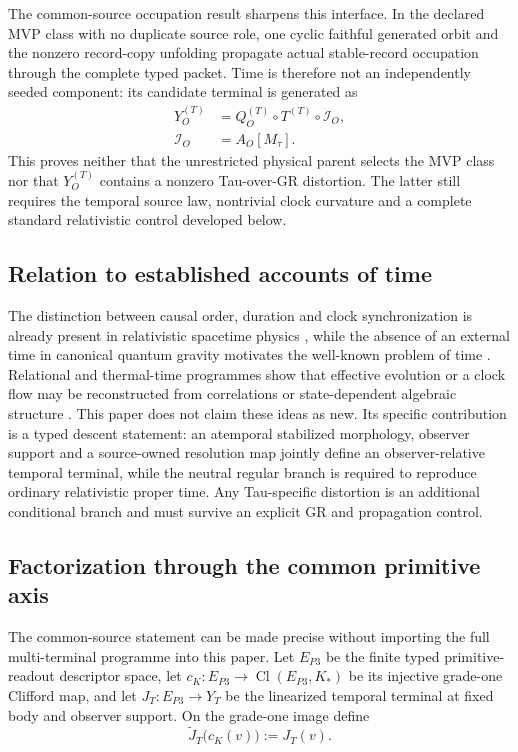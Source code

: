 \documentclass[11pt]{article}
\begin{document}
The common-source occupation result sharpens this interface. In the declared
MVP class with no duplicate source role, one cyclic faithful generated orbit
and the nonzero record-copy unfolding propagate actual stable-record
occupation through the complete typed packet. Time is therefore not an
independently seeded component: its candidate terminal is generated as
\begin{equation}
 \begin{split}
 Y_O^{(T)}&=Q_O^{(T)}\circ T^{(T)}\circ \mathcal I_O,\\
 \mathcal I_O&=A_O[M_\tau].
 \end{split}
 \label{eq:generated-time-terminal}
\end{equation}
This proves neither that the unrestricted physical parent selects the MVP
class nor that \(Y_O^{(T)}\) contains a nonzero Tau-over-GR distortion. The
latter still requires the temporal source law, nontrivial clock curvature and
a complete standard relativistic control developed below.

\subsection{Relation to established accounts of time}

The distinction between causal order, duration and clock synchronization is
already present in relativistic spacetime physics \cite{Minkowski1909}, while
the absence of an external time in canonical quantum gravity motivates the
well-known problem of time \cite{WheelerDeWitt1967,Rovelli2004}. Relational
and thermal-time programmes show that effective evolution or a clock flow may
be reconstructed from correlations or state-dependent algebraic structure
\cite{PageWootters1983,ConnesRovelli1994}. This paper does not claim these
ideas as new. Its specific contribution is a typed descent statement: an
atemporal stabilized morphology, observer support and a source-owned
resolution map jointly define an observer-relative temporal terminal, while
the neutral regular branch is required to reproduce ordinary relativistic
proper time. Any Tau-specific distortion is an additional conditional branch
and must survive an explicit GR and propagation control.

\subsection{Factorization through the common primitive axis}

The common-source statement can be made precise without importing the full
multi-terminal programme into this paper. Let \(E_{P3}\) be the finite typed
primitive-readout descriptor space, let
\(c_K:E_{P3}\rightarrow\operatorname{Cl}(E_{P3},K_*)\) be its injective
grade-one Clifford map, and let \(J_T:E_{P3}\rightarrow Y_T\) be the
linearized temporal terminal at fixed body and observer support. On the
grade-one image define
\begin{equation}
 \widetilde J_T\bigl(c_K(v)\bigr):=J_T(v).
 \label{eq:p3-time-factor}
\end{equation}
\end{document}
